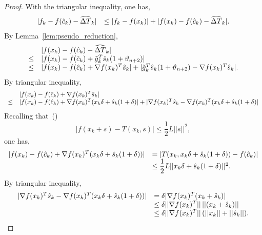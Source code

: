 \documentclass{article}[12pt]
\begin{document}
    \begin{proof}
    	With the triangular inequality, one has,
    	\begin{equation}
    		\label{eq:f_pseudotaylor_diff_sum_inexact_proof0}
    		\begin{array}{ll}
    			|f_k - f(\hat{c}_k) -\widehat{\Delta T}_k| & \leq |f_k-f(x_k)| + |f(x_k) - f(\hat{c}_k) - \widehat{\Delta T}_k|.
    		\end{array}
    	\end{equation}
    	By Lemma~\ref{lem:pseudo_reduction},
    	\begin{equation}
    		\label{eq:f_pseudotaylor_diff_sum_inexact_proof1}
    		\begin{array}{ll}
    			& |f(x_k) - f(\hat{c}_k) - \widehat{\Delta T}_k|\\
    			\leq &  |f(x_k) - f(\hat{c}_k) + \tilde{g}_k^T\hat{s}_{k}(1+\vartheta_{n+2})|\\
    			\leq & |f(x_k) - f(\hat{c}_k) + \nabla f(x_k)^T\hat{s}_{k}| + |\tilde{g}_k^T\hat{s}_{k}(1+\vartheta_{n+2}) - \nabla f(x_k)^T\hat{s}_{k}|.
    		\end{array}
    	\end{equation}
    	By triangular inequality,
    	\begin{equation}
    		\label{eq:f_pseudotaylor_diff_sum_inexact_proof_2}
    		\begin{array}{ll}
    			& |f(x_k) - f(\hat{c}_k) + \nabla f(x_k)^T\hat{s}_{k}|\\
    			\leq & |f(x_k) - f(\hat{c}_k) + \nabla f(x_k)^T(x_k \delta +\hat{s}_{k}(1+\delta)| + | \nabla f(x_k)^T\hat{s}_{k} - \nabla f(x_k)^T(x_k \delta +\hat{s}_{k}(1+\delta)|\\
    		\end{array}
    	\end{equation}
	    Recalling that~(\cite{birgin2017worst})
	    \begin{equation}
	    	|f(x_k+s) - T(x_k,s)| \leq \dfrac{1}{2}L||s||^2,
	    \end{equation}
	    one has, 
	    \begin{equation}
	    	\label{eq:f_pseudotaylor_diff_sum_inexact_proof_4}
	    	\begin{array}{ll}
	    		|f(x_k) - f(\hat{c}_k) + \nabla f(x_k)^T(x_k \delta +\hat{s}_{k}(1+\delta))| & = |T(x_k,x_k \delta +\hat{s}_{k}(1+\delta))- f(\hat{c}_k)|\\
	    		& \leq \dfrac{1}{2}L||x_k \delta + \hat{s}_{k}(1+\delta)||^2.
	    	\end{array}
	    \end{equation}
    	By triangular inequality,
    	\begin{equation}
    		\label{eq:f_pseudotaylor_diff_sum_inexact_proof_3}
    		\begin{array}{ll}
    			|\nabla f(x_k)^T\hat{s}_{k} - \nabla f(x_k)^T(x_k \delta +\hat{s}_{k}(1+\delta))| & = \delta|\nabla f(x_k)^T(x_k+\hat{s}_{k})|\\
    			& \leq \delta||\nabla f(x_k)^T||\,||(x_k+\hat{s}_{k})||\\
    			& \leq \delta||\nabla f(x_k)^T||\,(||x_k||+||\hat{s}_{k}||).
    		\end{array}
    	\end{equation}
  

\end{proof}
\end{document}
